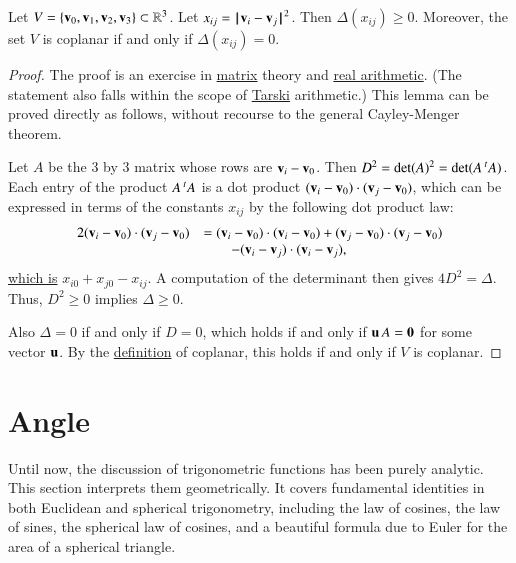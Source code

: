 \begin{lemma}[]\label{lemma:delta-pos}
  Let $V=\{{\mathbf v}_0,{\mathbf v}_1,{\mathbf v}_2,{\mathbf v}_3\}\subset\mathbb{R}^3$.  Let $x_{ij} =
  \norm{\v_i}{\v_j}^2$.  Then $\Delta(x_{ij})\ge 0$.  Moreover, the
  set $V$ is coplanar if and only if $\Delta(x_{ij}) = 0$.
\end{lemma}

\begin{proof} The proof is an exercise in
  \hyperref[back:matrix]{matrix} theory and
  \hyperref[back:analysis]{real arithmetic}.  (The statement also
  falls within the scope of \hyperref[back:tarski]{Tarski}
  arithmetic.)  This lemma can be proved directly as follows, without
  recourse to the general Cayley-Menger theorem.

  Let $A$ be the $3$ by $3$ matrix whose rows are ${\mathbf v}_i - {\mathbf v}_0$.  Then
  $D^2 = \det(A)^2 = \det(A \,\hbox{}^t A)$.  Each entry of the
  product $A\,\hbox{}^tA$ is a dot product $({\mathbf v}_i-{\mathbf v}_0)\cdot
  ({\mathbf v}_j-{\mathbf v}_0)$, which can be expressed in terms of the constants
  $x_{ij}$ by the following dot product law:
\begin{equation}\label{eqn:dot-law}
\begin{array}{lll}
  2 ({\mathbf v}_i-{\mathbf v}_0)\cdot ({\mathbf v}_j-{\mathbf v}_0) 
&= ({\mathbf v}_i-{\mathbf v}_0)\cdot({\mathbf v}_i-{\mathbf v}_0) + ({\mathbf v}_j-{\mathbf v}_0)\cdot ({\mathbf v}_j-{\mathbf v}_0) \\
  &\qquad - ({\mathbf v}_i-{\mathbf v}_j)\cdot ({\mathbf v}_i-{\mathbf v}_j),
\end{array}
\end{equation}
\hyperref[def:norm]{which is} $x_{i0} + x_{j0} - x_{ij}$.
A computation of the determinant then gives $4D^2=\Delta$.
Thus, $D^2\ge0$ implies $\Delta\ge 0$.

Also $\Delta=0$ if and only if $D=0$, which holds if and only if ${\mathbf u}\,
A = {\mathbf 0}$ for some vector ${\mathbf u}$.  By the
\hyperref[def:plane]{definition} of coplanar, this holds if and only
if $V$ is coplanar.
\end{proof}


\section{Angle}\label{sec:angle}

Until now, the discussion of trigonometric functions has been purely
analytic.  This section interprets them geometrically.  It covers
fundamental identities in both Euclidean and spherical trigonometry,
including the law of cosines, the law of sines, the spherical law of
cosines, and a beautiful formula due to Euler for the area of a
spherical triangle.

